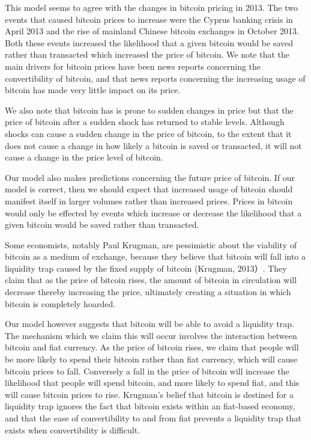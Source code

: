 This model seems to agree with the changes in bitcoin pricing in 2013.
The two events that caused bitcoin prices to increase were the Cyprus
banking crisis in April 2013 and the rise of mainland Chinese bitcoin
exchanges in October 2013.  Both these events increased the likelihood
that a given bitcoin would be saved rather than transacted which
increased the price of bitcoin.  We note that the main drivers for
bitcoin prices have been news reports concerning the convertibility of
bitcoin, and that news reports concerning the increasing usage of
bitcoin has made very little impact on its price.

We also note that bitcoin has is prone to sudden changes in price but
that the price of bitcoin after a sudden shock has returned to stable
levels.  Although shocks can cause a sudden change in the price of
bitcoin, to the extent that it does not cause a change in how likely a
bitcoin is saved or transacted, it will not cause a change in the
price level of bitcoin.

Our model also makes predictions concerning the future price of
bitcoin.  If our model is correct, then we should expect that
increased usage of bitcoin should manifest itself in larger volumes
rather than increased prices.  Prices in bitcoin would only be
effected by events which increase or decrease the likelihood that a
given bitcoin would be saved rather than transacted.

Some economists, notably Paul Krugman, are pessimistic about the
viability of bitcoin as a medium of exchange, because they believe
that bitcoin will fall into a liquidity trap caused by the fixed
supply of bitcoin (Krugman, 2013）.  They claim that as the price of
bitcoin rises, the amount of bitcoin in circulation will decrease
thereby increasing the price, ultimately creating a situation in which
bitcoin is completely hoarded.

Our model however suggests that bitcoin will be able to avoid a
liquidity trap.  The mechanism which we claim this will occur involves
the interaction between bitcoin and fiat currency.  As the price of
bitcoin rises, we claim that people will be more likely to spend their
bitcoin rather than fiat currency, which will cause bitcoin prices to
fall.  Conversely a fall in the price of bitcoin will increase the
likelihood that people will spend bitcoin, and more likely to spend
fiat, and this will cause bitcoin prices to rise.  Krugman's belief
that bitcoin is destined for a liquidity trap ignores the fact that
bitcoin exists within an fiat-based economy, and that the ease of
convertibility to and from fiat prevents a liquidity trap that exists
when convertibility is difficult.

